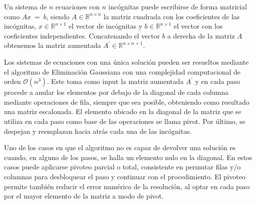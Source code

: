 Un sistema de $n$ ecuaciones con $n$ incógnitas puede escribirse de forma matricial como $Ax\ =\ b$, siendo $A \in \mathbb{R}^{n \times n}$ la matriz cuadrada con los coeficientes de las incógnitas, $x \in \mathbb{R}^{n \times 1}$ el vector de incógnitas y $b \in \mathbb{R}^{n \times 1}$ el vector con los coeficientes independientes. Concatenando el vector $b$ a derecha de la matriz $A$ obtenemos la matriz aumentada $A^{\prime} \in \mathbb{R}^{n \times n+1}$.

Los sistemas de ecuaciones con una única solución pueden ser resueltos mediante el algoritmo de Eliminación Gaussiana \cite{burden-gauss} con una complejidad computacional de orden $\mathcal{O}(n^3)$. Este toma como input la matriz aumentada $A^{\prime}$ y en cada paso procede a anular los elementos por debajo de la diagonal de cada columna mediante operaciones de fila, siempre que sea posible, obteniendo como resultado una matriz escalonada. El elemento ubicado en la diagonal de la matriz que se utiliza en cada paso como base de las operaciones se llama pivot. Por último, se despejan y reemplazan hacia atrás cada una de las incógnitas.

Uno de los casos en que el algoritmo no es capaz de devolver una solución es cuando, en alguno de los pasos, se halla un elemento nulo en la diagonal. En estos casos puede aplicarse pivoteo parcial o total, consistente en permutar filas y/o columnas para desbloquear el paso y continuar con el procedimiento. El pivoteo permite también reducir el error numérico de la resolución, al optar en cada paso por el mayor elemento de la matriz a modo de pivot.
